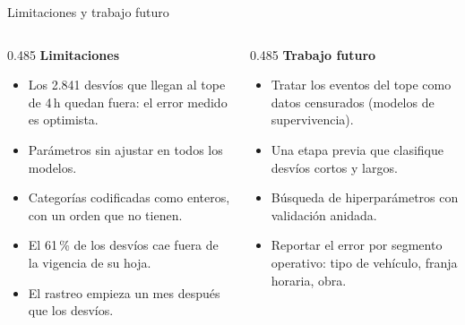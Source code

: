 \documentclass[aspectratio=169,10pt]{beamer}
\begin{document}
\begin{frame}{Limitaciones y trabajo futuro}
\begin{columns}[T,onlytextwidth]
\begin{column}{0.485\textwidth}
  \textbf{\color{rojo}Limitaciones}
  \begin{itemize}\small\setlength{\itemsep}{3pt}
    \item Los 2.841 desvíos que llegan al tope de 4\,h quedan fuera: el error medido es optimista.
    \item Parámetros sin ajustar en todos los modelos.
    \item Categorías codificadas como enteros, con un orden que no tienen.
    \item El 61\,\% de los desvíos cae fuera de la vigencia de su hoja.
    \item El rastreo empieza un mes después que los desvíos.
  \end{itemize}
\end{column}
\begin{column}{0.485\textwidth}
  \textbf{\color{verde}Trabajo futuro}
  \begin{itemize}\small\setlength{\itemsep}{3pt}
    \item Tratar los eventos del tope como datos censurados (modelos de supervivencia).
    \item Una etapa previa que clasifique desvíos cortos y largos.
    \item Búsqueda de hiperparámetros con validación anidada.
    \item Reportar el error por segmento operativo: tipo de vehículo, franja horaria, obra.
  \end{itemize}
\end{column}
\end{columns}
\end{frame}

{
\begin{frame}[noframenumbering]
\end{frame}}
\end{document}

